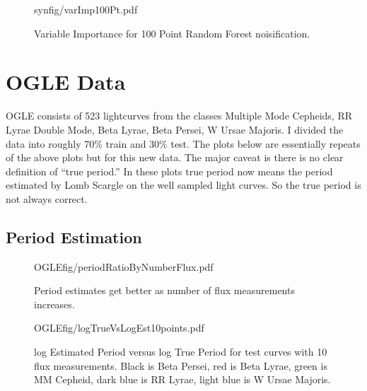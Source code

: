 \documentclass[10pt]{article}
\begin{document}
\begin{figure}[H]
  \begin{center}
    \begin{includegraphics}[height=4in,width=4in]{synfig/varImp100Pt.pdf}
      \caption{Variable Importance for 100 Point Random Forest noisification.\label{fig:varImp100Pt}}
    \end{includegraphics}
    \end{center}
  \end{figure}
  
  
\section{OGLE Data}

OGLE consists of 523 lightcurves from the classes Multiple Mode Cepheids, RR Lyrae Double Mode, Beta Lyrae, Beta Persei, W Ursae Majoris. I divided the data into roughly 70\% train and 30\% test. The plots below are essentially repeats of the above plots but for this new data. The major caveat is there is no clear definition of ``true period.'' In these plots true period now means the period estimated by Lomb Scargle on the well sampled light curves. So the true period is not always correct.

\subsection{Period Estimation}

\begin{figure}[H]
  \begin{center}
    \begin{includegraphics}[height=4in,width=4in]{OGLEfig/periodRatioByNumberFlux.pdf}
      \caption{Period estimates get better as number of flux measurements increases.\label{fig:periodRatioByNumberFluxOGLE}}
    \end{includegraphics}
  \end{center}
\end{figure}


\begin{figure}[H]
  \begin{center}
    \begin{includegraphics}[height=4in,width=4in]{OGLEfig/logTrueVsLogEst10points.pdf}
      \caption{log Estimated Period versus log True Period for test curves with 10 flux measurements. Black is Beta Persei, red is Beta Lyrae, green is MM Cepheid, dark blue is RR Lyrae, light blue is W Ursae Majoris.\label{fig:logTrueVsLogEst10pointsOGLE}}
    \end{includegraphics}
  \end{center}
\end{figure}
\end{document}
